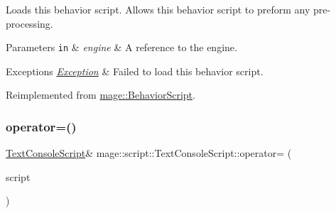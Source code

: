 Loads this behavior script. Allows this behavior script to preform any pre-\/processing.


\begin{DoxyParams}[1]{Parameters}
\mbox{\tt in}  & {\em engine} & A reference to the engine. \\
\hline
\end{DoxyParams}

\begin{DoxyExceptions}{Exceptions}
{\em \hyperlink{classmage_1_1_exception}{Exception}} & Failed to load this behavior script. \\
\hline
\end{DoxyExceptions}


Reimplemented from \hyperlink{classmage_1_1_behavior_script_ae7864876b2ffb1d1d8d8a56e3099f1f2}{mage\+::\+Behavior\+Script}.

\hypertarget{classmage_1_1script_1_1_text_console_script_a68af2a144f641c9813b333544fe3562a}{}\label{classmage_1_1script_1_1_text_console_script_a68af2a144f641c9813b333544fe3562a} 
\subsubsection{\texorpdfstring{operator=()}{operator=()}\hspace{0.1cm}{\footnotesize\ttfamily [1/2]}}
{\footnotesize\ttfamily \hyperlink{classmage_1_1script_1_1_text_console_script}{Text\+Console\+Script}\& mage\+::script\+::\+Text\+Console\+Script\+::operator= (\begin{DoxyParamCaption}\item[{const \hyperlink{classmage_1_1script_1_1_text_console_script}{Text\+Console\+Script} \&}]{script }\end{DoxyParamCaption})\hspace{0.3cm}{\ttfamily [delete]}}

\hypertarget{classmage_1_1script_1_1_text_console_script_ae8560dece8d507ee338dda68e3176fed}{}\label{classmage_1_1script_1_1_text_console_script_ae8560dece8d507ee338dda68e3176fed} 
